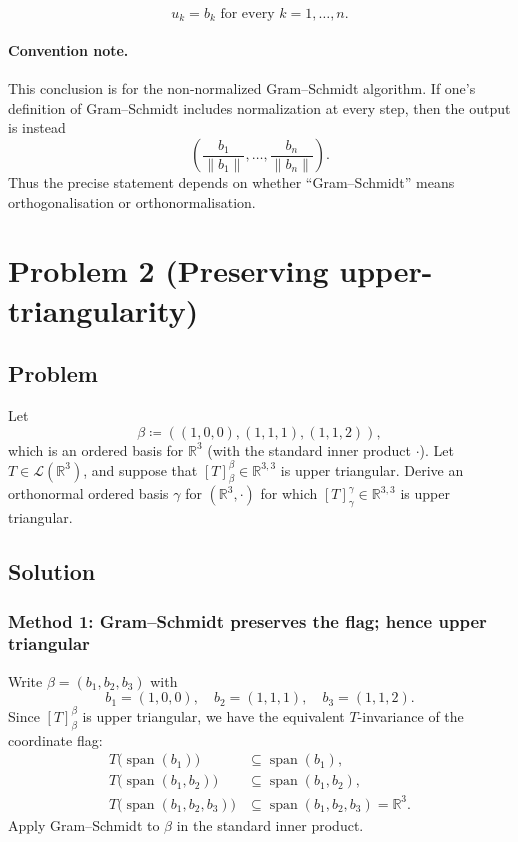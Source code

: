 \documentclass[12pt]{article}
\newcommand{\df}{\coloneqq}
\newcommand{\R}{\mathbb{R}}
\newcommand{\cL}{\mathcal{L}}
\DeclareMathOperator{\Span}{span}
\begin{document}
\[
\boxed{\,u_k=b_k\text{ for every }k=1,\dots,n.\,}
\]

\paragraph{Convention note.}
This conclusion is for the non-normalized Gram--Schmidt algorithm. If one's definition of Gram--Schmidt includes normalization at every step, then the output is instead
\[
\left(\frac{b_1}{\|b_1\|},\dots,\frac{b_n}{\|b_n\|}\right).
\]
Thus the precise statement depends on whether ``Gram--Schmidt'' means orthogonalisation or orthonormalisation.


\newpage
\section{Problem 2 (Preserving upper-triangularity)}
\subsection{Problem}
Let
\[
\beta \df ((1,0,0),(1,1,1),(1,1,2)),
\]
which is an ordered basis for $\R^3$ (with the standard inner product $\cdot$).
Let $T\in \cL(\R^3)$, and suppose that $[T]_{\beta}^{\beta}\in \R^{3,3}$ is upper triangular.
Derive an orthonormal ordered basis $\gamma$ for $(\R^3,\cdot)$ for which $[T]_{\gamma}^{\gamma}\in\R^{3,3}$ is upper triangular.

\subsection{Solution}

\subsubsection{Method 1: Gram--Schmidt preserves the flag; hence upper triangular}
Write $\beta=(b_1,b_2,b_3)$ with
\[
b_1=(1,0,0),\quad b_2=(1,1,1),\quad b_3=(1,1,2).
\]
Since $[T]_{\beta}^{\beta}$ is upper triangular, we have the equivalent $T$-invariance of the coordinate flag:
\[
\begin{aligned}
T\bigl(\Span(b_1)\bigr)&\subseteq \Span(b_1),\\
T\bigl(\Span(b_1,b_2)\bigr)&\subseteq \Span(b_1,b_2),\\
T\bigl(\Span(b_1,b_2,b_3)\bigr)&\subseteq \Span(b_1,b_2,b_3)=\R^3.
\end{aligned}
\]
Apply Gram--Schmidt to $\beta$ in the standard inner product.
\end{document}
